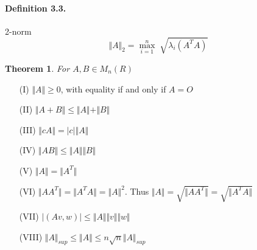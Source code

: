 \documentclass[10pt]{article}
\newtheorem{theorem}{Theorem}[section]
\begin{document}
\paragraph{Definition 3.3.} 2-norm 
\begin{equation}
\Vert A \Vert_2 = \max_{i=1}^n \sqrt[]{\lambda_i (A^TA)}
\end{equation}

\begin{theorem}
For $A,B \in M_n(R)$
\end{theorem}
\begin{itemize}
\item[(I)]{$\Vert A \Vert \geq 0 $, with equality if and only if $A=O$}
\item[(II)]{$\Vert A+B\Vert \leq \Vert A \Vert + \Vert B \Vert$}
\item[(III)]{$\Vert cA\Vert = \vert c \vert \Vert A \Vert$}
\item[(IV)]{$\Vert AB \Vert \leq \Vert A \Vert \Vert B \Vert$}
\item[(V)]{$\Vert A \Vert = \Vert A^T \Vert$}
\item[(VI)]{$\Vert AA^T\Vert = \Vert A^TA \Vert= \Vert A \Vert^2$. Thus $\Vert A \Vert = \sqrt{\Vert AA^T \Vert} = \sqrt{\Vert A^TA \Vert}$}
\item[(VII)]{$\vert (Av,w) \vert \leq \Vert A \Vert \Vert v \Vert \Vert w \Vert$}
\item[(VIII)]{$\Vert A \Vert_{sup} \leq \Vert A \Vert \leq n \sqrt{n} \Vert A \Vert_{sup} $}
\end{itemize}


\begin{thebibliography}{1}



\end{thebibliography}
\end{document}
